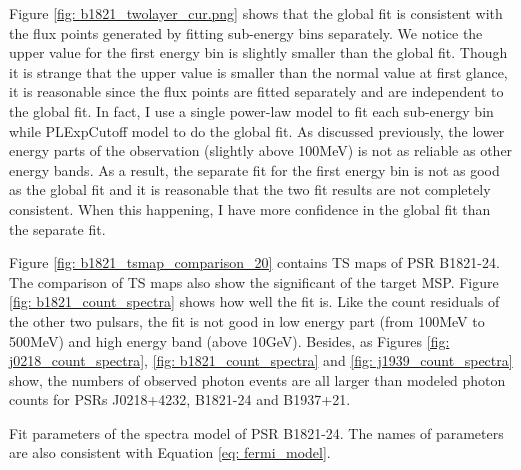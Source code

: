 \documentclass[12pt]{report}
\newcommand{\mycaption}[1]{\protect \caption{#1}}
\begin{document}
      Figure \ref{fig: b1821_twolayer_cur.png} shows that the global fit is consistent with 
      the flux points generated by fitting sub-energy bins separately. We notice the upper value 
      for the first energy bin is slightly smaller than the global fit. 
      Though it is strange that the upper value is smaller than the normal value at first glance, 
      it is reasonable since the flux points are fitted separately and are independent to 
      the global fit. In fact, I use a single power-law model to fit each sub-energy bin while 
      PLExpCutoff model to do the global fit. As discussed previously, the lower energy parts of 
      the observation (slightly above 100MeV) is not as reliable as other energy bands. As a result, the 
      separate fit for the first energy bin is not as good as the global fit and it is reasonable 
      that the two fit results are not completely consistent. When this happening, I have 
      more confidence in the global fit than the separate fit.
            
      Figure \ref{fig: b1821_tsmap_comparison_20} contains TS maps of PSR B1821-24. The 
      comparison of TS maps also show the significant of the target MSP. Figure 
      \ref{fig: b1821_count_spectra} shows how well the fit is. Like the count residuals of 
      the other two pulsars, the fit is not good in low energy part (from 100MeV to 500MeV)
      and high energy band (above 10GeV). Besides, as Figures \ref{fig: j0218_count_spectra},
      \ref{fig: b1821_count_spectra} and \ref{fig: j1939_count_spectra} show, the numbers of 
      observed photon events are all larger than modeled photon counts for PSRs J0218+4232, 
      B1821-24 and B1937+21. 

      \begin{table}[!htp]
        \centering
          \mycaption{Fit parameters of the spectra model of PSR B1821-24. 
            The names of parameters are also consistent with Equation
            \ref{eq: fermi_model}.}
            
          \label{table: b1821_fit_result}        
      \end{table}  
      \vspace{1cm}
          
\end{document}

